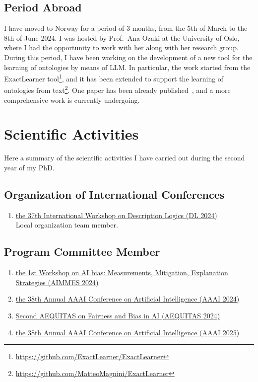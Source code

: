 \documentclass[11pt]{article}
\begin{document}
\subsection{Period Abroad}
I have moved to Norway for a period of 3 months, from the 5th of March to the 8th of June 2024.
%
I was hosted by Prof.~Ana Ozaki at the University of Oslo, where I had the opportunity to work with her along with her research group.
%
During this period, I have been working on the development of a new tool for the learning of ontologies by means of \ac{LLM}.
%
In particular, the work started from the ExactLearner tool\footnote{\url{https://github.com/ExactLearner/ExactLearner}}, and it has been extended to support the learning of ontologies from text\footnote{\url{https://github.com/MatteoMagnini/ExactLearner}}.
%
One paper has been already published~\cite{DBLP:conf/dlog/MagniniOS24}, and a more comprehensive work is currently undergoing.

\section{Scientific Activities}\label{sec:scientific-activities}
%
Here a summary of the scientific activities I have carried out during the second year of my PhD\@.

\subsection{Organization of International Conferences}\label{subsec:organization-of-international-conferences}

\begin{enumerate}
	\item \href{https://dl2024.w.uib.no/organization/}{the 37th International Workshop on Description Logics (DL 2024)}
	\\Local organization team member.
\end{enumerate}

\subsection{Program Committee Member}\label{subsec:program-committee-member}

\begin{enumerate}
	\item \href{https://fairnesscluster.github.io/aimmes23.github.io/index.html}{the 1st Workshop on AI bias: Measurements, Mitigation, Explanation Strategies (AIMMES 2024)}
	\item \href{https://apice.unibo.it/xwiki/bin/view/Event/Aaai2024}{the 38th Annual AAAI Conference on Artificial Intelligence (AAAI 2024)}
	\item \href{https://aequitas-aod.github.io/aequitas-ecai24.github.io/pc-member.html}{Second AEQUITAS on Fairness and Bias in AI (AEQUITAS 2024)}
	\item \href{https://aaai.org/conference/aaai/aaai-25/}{the 38th Annual AAAI Conference on Artificial Intelligence (AAAI 2025)}
\end{enumerate}
\end{document}
